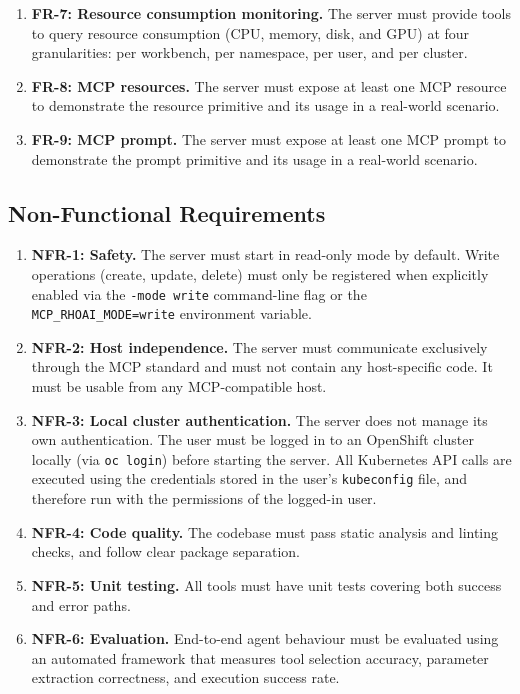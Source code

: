 \documentclass[
  digital,     %
  oneside,     %
  nosansbold,  %
  nocolorbold, %
  lof,         %
  lot,         %
]{fithesis4}
\begin{document}
\begin{enumerate}
  \item \textbf{FR-7: Resource consumption monitoring.} The server must
        provide tools to query resource consumption (CPU, memory, disk, and
        GPU) at four granularities: per workbench, per namespace, per user,
        and per cluster.

  \item \textbf{FR-8: MCP resources.} The server must expose at least one
        MCP resource to demonstrate the resource primitive and its usage in
        a real-world scenario.

  \item \textbf{FR-9: MCP prompt.} The server must expose at least one MCP
        prompt to demonstrate the prompt primitive and its usage in a
        real-world scenario.
\end{enumerate}

\subsection{Non-Functional Requirements}
\label{subsec:nonfunctional-req}

\begin{enumerate}
  \item \textbf{NFR-1: Safety.} The server must start in read-only mode by
        default. Write operations (create, update, delete) must only be
        registered when explicitly enabled via the \texttt{-mode write}
        command-line flag or the \texttt{MCP\_RHOAI\_\allowbreak MODE=write}
        environment variable.

  \item \textbf{NFR-2: Host independence.} The server must communicate
        exclusively through the MCP standard and must not contain any
        host-specific code. It must be usable from any MCP-compatible host.

  \item \textbf{NFR-3: Local cluster authentication.} The server does not
        manage its own authentication. The user must be logged in to an
        OpenShift cluster locally (via \texttt{oc login}) before starting
        the server. All Kubernetes API calls are executed using the
        credentials stored in the user's \texttt{kubeconfig} file, and
        therefore run with the permissions of the logged-in user.

  \item \textbf{NFR-4: Code quality.} The codebase must pass static
        analysis and linting checks, and follow clear package separation.

  \item \textbf{NFR-5: Unit testing.} All tools must have unit tests
        covering both success and error paths.

  \item \textbf{NFR-6: Evaluation.} End-to-end agent behaviour must be
        evaluated using an automated framework that measures tool
        selection accuracy, parameter extraction correctness, and execution
        success rate.
\end{enumerate}
\end{document}
